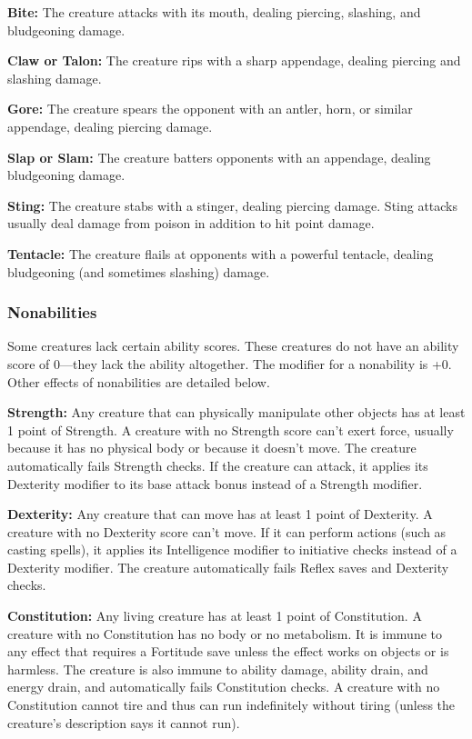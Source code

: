 \textbf{Bite:} The creature attacks with its mouth, dealing piercing, slashing, and bludgeoning damage.

\textbf{Claw or Talon:} The creature rips with a sharp appendage, dealing piercing and slashing damage.

\textbf{Gore:} The creature spears the opponent with an antler, horn, or similar appendage, dealing piercing damage.

\textbf{Slap or Slam:} The creature batters opponents with an appendage, dealing bludgeoning damage.

\textbf{Sting:} The creature stabs with a stinger, dealing piercing damage. Sting attacks usually deal damage from poison in addition to hit point damage.

\textbf{Tentacle:} The creature flails at opponents with a powerful tentacle, dealing bludgeoning (and sometimes slashing) damage.

\subsubsection{Nonabilities}
Some creatures lack certain ability scores. These creatures do not have an ability score of 0---they lack the ability altogether. The modifier for a nonability is +0. Other effects of nonabilities are detailed below.

\textbf{Strength:} Any creature that can physically manipulate other objects has at least 1 point of Strength. A creature with no Strength score can't exert force, usually because it has no physical body or because it doesn't move. The creature automatically fails Strength checks. If the creature can attack, it applies its Dexterity modifier to its base attack bonus instead of a Strength modifier.

\textbf{Dexterity:} Any creature that can move has at least 1 point of Dexterity. A creature with no Dexterity score can't move. If it can perform actions (such as casting spells), it applies its Intelligence modifier to initiative checks instead of a Dexterity modifier. The creature automatically fails Reflex saves and Dexterity checks.

\textbf{Constitution:} Any living creature has at least 1 point of Constitution. A creature with no Constitution has no body or no metabolism. It is immune to any effect that requires a Fortitude save unless the effect works on objects or is harmless. The creature is also immune to ability damage, ability drain, and energy drain, and automatically fails Constitution checks. A creature with no Constitution cannot tire and thus can run indefinitely without tiring (unless the creature's description says it cannot run).

